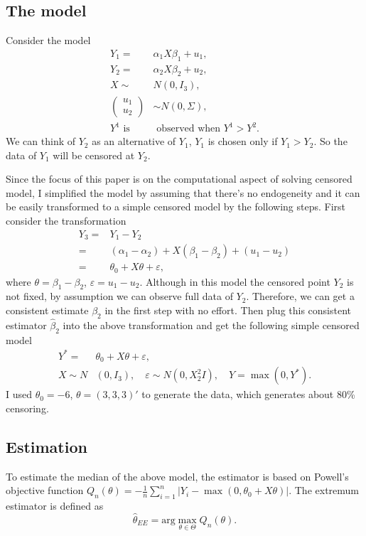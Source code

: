 \documentclass[12pt]{article}
\theoremstyle{plain} \newtheorem{theorem}{Theorem}
\theoremstyle{definition} \newtheorem{definition}{Definition}
\begin{document}
\subsection{The model}
Consider the model
\begin{align*}
  Y_1 = & \alpha_1 X\beta_1 +u_1, \\
  Y_2 = & \alpha_2 X\beta_2 +u_2, \\
  X \sim & N(0,I_3), \\
  \left( \begin{array}{c} u_1 \\ u_2 \end{array} \right)& \sim  N(0,\Sigma), \\
  Y^1 \mbox{ is}& \mbox{ observed when } Y^1> Y^2.
\end{align*}
We can think of $Y_2$ as an alternative of $Y_1$, $Y_1$ is chosen only if $Y_1>Y_2$. So the data of $Y_1$ will be censored at $Y_2$.

Since the focus of this paper is on the computational aspect of solving censored model, I simplified the model by assuming that there's no endogeneity and it can be easily transformed to a simple censored model by the following steps. First consider the transformation
\begin{align*}
  Y_3 = & Y_1 -Y_2 \\
  = & (\alpha_1 - \alpha_2) + X(\beta_1 - \beta_2) +(u_1 - u_2) \\
  = & \theta_0 + X\theta + \varepsilon,
\end{align*}
where $\theta = \beta_1 - \beta_2$, $\varepsilon = u_1 -u_2$. Although in this model the censored point $Y_2$ is not fixed, by assumption we can observe full data of $Y_2$. Therefore, we can get a consistent estimate $\beta_2$ in the first step with no effort. Then plug this consistent estimator $\hat{\beta}_2$ into the above transformation and get the following simple censored model
\begin{align*}
  Y^{*} = & \theta_0 + X\theta + \varepsilon, \\ 
  X\sim N&(0,I_3), \quad \varepsilon \sim  N(0,X_2^2I), \quad  Y =  \max(0,Y^{*}).
\end{align*}
I used $\theta_0 = -6$, $\theta = (3,3,3)'$ to generate the data, which generates about 80\% censoring.

\subsection{Estimation}
\label{sec:estimation}
To estimate the median of the above model, the estimator is based on Powell's objective function $Q_n(\theta) = -\frac{1}{n}\sum\limits_{i=1}^n|Y_i-\max(0,\theta_0+X\theta)|$. The extremum estimator is defined as
\begin{equation*}
    \hat{\theta}_{EE} = \mathrm{arg}\max_{\theta\in\Theta} Q_n(\theta).
\end{equation*}
\end{document}
